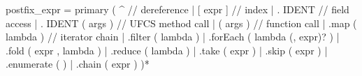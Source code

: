 \documentclass[
  11pt,
  a4paper,
]{report}
\newenvironment{Shaded}{\begin{snugshade}\small}{\end{snugshade}}
\newcommand{\NormalTok}[1]{#1}
\begin{document}
\begin{Shaded}
\begin{Highlighting}[]
\NormalTok{postfix\_expr   = primary}
\NormalTok{                 ( \textquotesingle{}\^{}\textquotesingle{}                              // dereference}
\NormalTok{                 | \textquotesingle{}[\textquotesingle{} expr \textquotesingle{}]\textquotesingle{}                    // index}
\NormalTok{                 | \textquotesingle{}.\textquotesingle{} IDENT                       // field access}
\NormalTok{                 | \textquotesingle{}.\textquotesingle{} IDENT \textquotesingle{}(\textquotesingle{} args \textquotesingle{})\textquotesingle{}          // UFCS method call}
\NormalTok{                 | \textquotesingle{}(\textquotesingle{} args \textquotesingle{})\textquotesingle{}                    // function call}
\NormalTok{                 | \textquotesingle{}.map\textquotesingle{} \textquotesingle{}(\textquotesingle{} lambda \textquotesingle{})\textquotesingle{}           // iterator chain}
\NormalTok{                 | \textquotesingle{}.filter\textquotesingle{} \textquotesingle{}(\textquotesingle{} lambda \textquotesingle{})\textquotesingle{}}
\NormalTok{                 | \textquotesingle{}.forEach\textquotesingle{} \textquotesingle{}(\textquotesingle{} lambda (\textquotesingle{},\textquotesingle{} expr)? \textquotesingle{})\textquotesingle{}}
\NormalTok{                 | \textquotesingle{}.fold\textquotesingle{} \textquotesingle{}(\textquotesingle{} expr \textquotesingle{},\textquotesingle{} lambda \textquotesingle{})\textquotesingle{}}
\NormalTok{                 | \textquotesingle{}.reduce\textquotesingle{} \textquotesingle{}(\textquotesingle{} lambda \textquotesingle{})\textquotesingle{}}
\NormalTok{                 | \textquotesingle{}.take\textquotesingle{} \textquotesingle{}(\textquotesingle{} expr \textquotesingle{})\textquotesingle{}}
\NormalTok{                 | \textquotesingle{}.skip\textquotesingle{} \textquotesingle{}(\textquotesingle{} expr \textquotesingle{})\textquotesingle{}}
\NormalTok{                 | \textquotesingle{}.enumerate\textquotesingle{} \textquotesingle{}(\textquotesingle{} \textquotesingle{})\textquotesingle{}}
\NormalTok{                 | \textquotesingle{}.chain\textquotesingle{} \textquotesingle{}(\textquotesingle{} expr \textquotesingle{})\textquotesingle{}}
\NormalTok{                 )*}


\end{Highlighting}
\end{Shaded}
\end{document}
